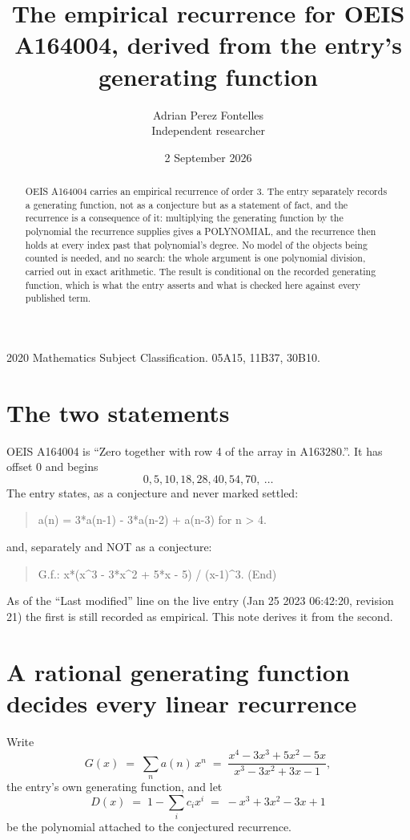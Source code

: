\documentclass[11pt,a4paper]{article}
\title{The empirical recurrence for OEIS A164004, derived from the entry's generating function}
\author{Adrian Perez Fontelles\\ \small Independent researcher}
\date{2 September 2026}
\theoremstyle{plain}
\theoremstyle{definition}
\begin{document}
\maketitle

\begin{abstract}
OEIS A164004 carries an empirical recurrence of order $3$. The entry separately records a
generating function, not as a conjecture but as a statement of fact, and the recurrence is a
consequence of it: multiplying the generating function by the polynomial the recurrence
supplies gives a POLYNOMIAL, and the recurrence then holds at every index past that
polynomial's degree. No model of the objects being counted is needed, and no search: the
whole argument is one polynomial division, carried out in exact arithmetic. The result is
conditional on the recorded generating function, which is what the entry asserts and what is
checked here against every published term.
\end{abstract}

\noindent\small 2020 Mathematics Subject Classification. 05A15, 11B37, 30B10.\normalsize

\section{The two statements}

OEIS A164004 is ``Zero together with row 4 of the array in A163280.''. It has offset $0$ and begins
\[
0, 5, 10, 18, 28, 40, 54, 70,\ \dots
\]
The entry states, as a conjecture and never marked settled:
\begin{quote}
a(n) = 3*a(n-1) - 3*a(n-2) + a(n-3) for n > 4.
\end{quote}
and, separately and NOT as a conjecture:
\begin{quote}
G.f.: x*(x\^{}3 - 3*x\^{}2 + 5*x - 5) / (x-1)\^{}3. (End)
\end{quote}
As of the ``Last modified'' line on the live entry (Jan 25 2023 06:42:20, revision 21) the first is still
recorded as empirical. This note derives it from the second.

\section{A rational generating function decides every linear recurrence}

Write
\[
G(x)\;=\;\sum_{n}a(n)\,x^{n}\;=\;\frac{x^{4} - 3 x^{3} + 5 x^{2} - 5 x}{x^{3} - 3 x^{2} + 3 x - 1},
\]
the entry's own generating function, and let
\[
D(x)\;=\;1-\sum_i c_i x^{i}\;=\;- x^{3} + 3 x^{2} - 3 x + 1
\]
be the polynomial attached to the conjectured recurrence.
\end{document}
